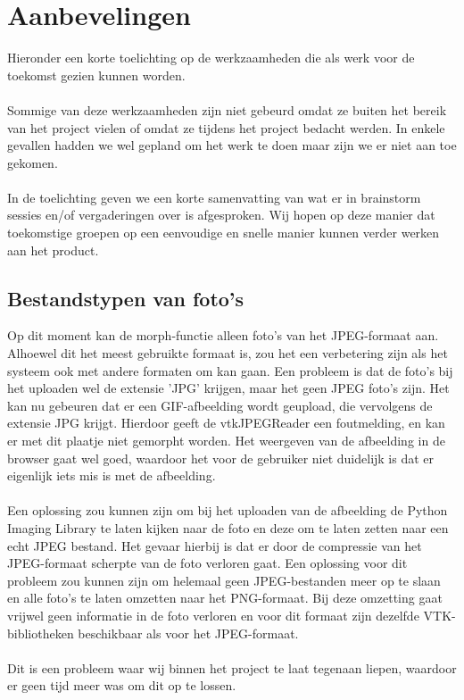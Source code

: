 \section{Aanbevelingen} %
\label{Aanbevelingen}
Hieronder een korte toelichting op de werkzaamheden die als werk voor de toekomst gezien kunnen worden.
\\
\\
Sommige van deze werkzaamheden zijn niet gebeurd omdat ze buiten het bereik van het project vielen of omdat ze tijdens het project bedacht werden. 
In enkele gevallen hadden we wel gepland om het werk te doen maar zijn we er niet aan toe gekomen.  
\\
\\
In de toelichting geven we een korte samenvatting van wat er in brainstorm sessies en/of vergaderingen over is afgesproken. 
Wij hopen op deze manier dat toekomstige groepen op een eenvoudige en snelle manier kunnen verder werken aan het product.

\subsection{Bestandstypen van foto's} %
Op dit moment kan de morph-functie alleen foto's van het JPEG-formaat aan. 
Alhoewel dit het meest gebruikte formaat is, zou het een verbetering zijn als het systeem ook met andere formaten om kan gaan. 
Een probleem is dat de foto's bij het uploaden wel de extensie 'JPG' krijgen, maar het geen JPEG foto's zijn. 
Het kan nu gebeuren dat er een GIF-afbeelding wordt geupload, die vervolgens de extensie JPG krijgt. 
Hierdoor geeft de vtkJPEGReader een foutmelding, en kan er met dit plaatje niet gemorpht worden. 
Het weergeven van de afbeelding in de browser gaat wel goed, waardoor het voor de gebruiker niet duidelijk is dat er eigenlijk iets mis is met de afbeelding.
\\
\\
Een oplossing zou kunnen zijn om bij het uploaden van de afbeelding de Python Imaging Library te laten kijken naar de foto en deze om te laten zetten naar een echt JPEG bestand. 
Het gevaar hierbij is dat er door de compressie van het JPEG-formaat scherpte van de foto verloren gaat.
Een oplossing voor dit probleem zou kunnen zijn om helemaal geen JPEG-bestanden meer op te slaan en alle foto's te laten omzetten naar het PNG-formaat. Bij deze omzetting gaat vrijwel geen informatie in de foto verloren en voor dit formaat zijn dezelfde VTK-bibliotheken beschikbaar als voor het JPEG-formaat.
\\
\\
Dit is een probleem waar wij binnen het project te laat tegenaan liepen, waardoor er geen tijd meer was om dit op te lossen.

